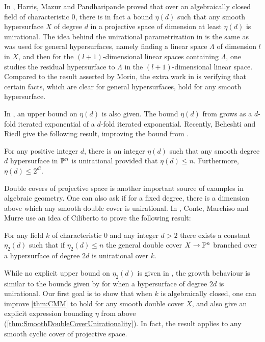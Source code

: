 In \cite{HMP}, Harris, Mazur and Pandharipande proved that over an algebraically closed field of characteristic $0$, there is in fact  a bound $\eta(d)$ such that any smooth hypersurface $X$ of degree $d$ in a projective space of dimension at least $\eta(d)$ is unirational. The idea behind the unirational parametrization in \cite{HMP} is the same as was used for general hypersurfaces, namely finding a linear space $\Lambda$ of dimension $l$ in $X$, and then for the $(l+1)$-dimensional linear spaces containing $\Lambda$, one studies the residual hypersurface to $\Lambda$ in the $(l+1)$-dimensional linear space. Compared to the result asserted by Morin, the extra work in \cite{HMP} is verifying that certain facts, which are clear for general hypersurfaces, hold for any smooth hypersurface.

In \cite{HMP}, an upper bound on $\eta(d)$ is also given. The bound $\eta(d)$ from \cite{HMP} grows as a $d$-fold iterated exponential of a $d$-fold iterated exponential. Recently, Beheshti and Riedl give the following result, improving the bound from \cite{HMP}.
	\begin{theorem}
		\label{thm:BRHypersurface}
		For any positive integer $d$, there is an integer $\eta(d)$ such that any smooth degree $d$ hypersurface in $\P^n$ is unirational provided that $\eta(d) \leq n$. Furthermore, $\eta(d) \leq 2^{d!}$.
	\end{theorem}
	
Double covers of projective space is another important source of examples in algebraic geometry. One can also ask if for a fixed degree, there is a dimension above which any smooth double cover is unirational. In \cite{CMMDoubleCover}, Conte, Marchiso and Murre use an idea of Ciliberto to prove the following result:
	\begin{theorem}
		\label{thm:CMM}
		For any field $k$ of characteristic 0 and any integer $d > 2$ there exists a constant $\eta_2(d)$ such that if $\eta_2(d) \leq n$ the general double cover $X \to \P^n$ branched over a hypersurface of degree $2d$ is unirational over $k$.
	\end{theorem}
While no explicit upper bound on $\eta_2(d)$ is given in \cite{CMMDoubleCover}, the growth behaviour is similar to the bounds given by \cite{Ramero} for when a hypersurface of degree $2d$ is unirational.
	Our first goal is to show that when $k$ is algebraically closed, one can improve \cref{thm:CMM} to hold for any smooth double cover $X$, and also give an explicit expression bounding $\eta$ from above (\cref{thm:SmoothDoubleCoverUnirationality}). In fact, the result applies to any smooth cyclic cover of projective space.

